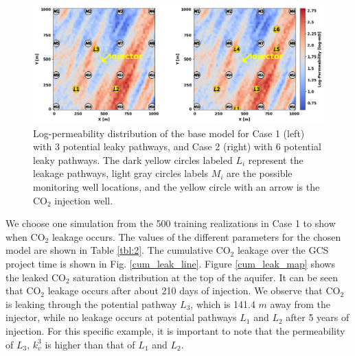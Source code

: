 \documentclass[10pt, twoside]{article}
\begin{document}
\begin{figure}[H]
\centering
\includegraphics[width=15 cm]{Figure 7.png}
\caption{Log-permeability distribution of the base model for Case 1 (left) with 3 potential leaky pathways, and Case 2 (right) with 6 potential leaky pathways. The dark yellow circles labeled $L_i$ represent the leakage pathways, light gray circles labels $M_i$ are the possible monitoring well locations, and the yellow circle with an arrow is the CO$_2$ injection well.}
\label{cases}
\end{figure}

We choose one simulation from the 500 training realizations in Case 1 to show when CO$_2$ leakage occurs. The values of the different parameters for the chosen model are shown in Table \ref{tbl:2}. The cumulative CO$_2$ leakage over the GCS project time is shown in Fig. \ref{cum_leak_line}. Figure \ref{cum_leak_map} shows the leaked CO$_2$ saturation distribution at the top of the aquifer. It can be seen that CO$_2$ leakage occurs after about 210 days of injection. We observe that CO$_2$ is leaking through the potential pathway $L_3$, which is 141.4 $m$ away from the injector, while no leakage occurs at potential pathways $L_1$ and $L_2$ after 5 years of injection. For this specific example, it is important to note that the permeability of $L_3$, $k_v^3$ is higher than that of $L_1$ and $L_2$.
\end{document}
